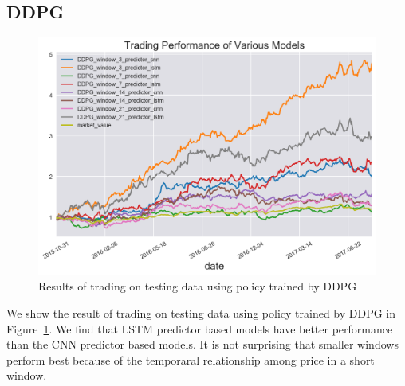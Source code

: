 \documentclass[a4paper, 10pt]{article}
\begin{document}
\begin{spacing}{1.2}
    \subsection{DDPG}
    \begin{figure}[htbp]
      \centering
      \includegraphics[scale=0.7]{ddpg_result}
      \caption{Results of trading on testing data using policy trained by DDPG}
      \label{fig:ddpg}
    \end{figure}
    We show the result of trading on testing data using policy trained by DDPG in Figure~\ref{fig:ddpg}. We find that LSTM predictor based models have better performance than the CNN predictor based models. It is not surprising that smaller windows perform best because of the temporaral relationship among price in a short window.
    

\end{spacing}
\end{document}
